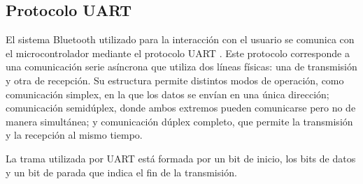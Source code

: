 \subsection{Protocolo UART}
El sistema Bluetooth utilizado para la interacción con el usuario se comunica con el microcontrolador mediante el protocolo UART \citep{UART}. Este protocolo corresponde a una comunicación serie asíncrona que utiliza dos líneas físicas: una de transmisión y otra de recepción. Su estructura permite distintos modos de operación, como comunicación simplex, en la que los datos se envían en una única dirección; comunicación semidúplex, donde ambos extremos pueden comunicarse pero no de manera simultánea; y comunicación dúplex completo, que permite la transmisión y la recepción al mismo tiempo.

La trama utilizada por UART está formada por un bit de inicio, los bits de datos y un bit de parada que indica el fin de la transmisión.